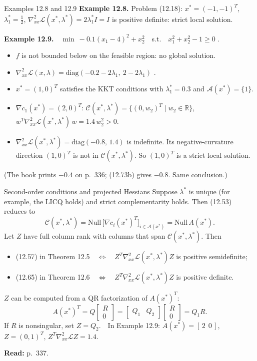 \documentclass[aspectratio=169,12pt]{beamer}
\newcommand{\R}{\mathbb{R}}
\newcommand{\xs}{x^{*}}
\newcommand{\eqn}[1]{\text{\small(#1)}}
\newcommand{\readbook}[1]{{\color{red}\textbf{Read:} #1}}
\newcommand{\ls}{\lambda^{*}}
\newcommand{\cA}{\mathcal{A}}
\newcommand{\cC}{\mathcal{C}}
\newcommand{\cL}{\mathcal{L}}
\newcommand{\hessL}{\nabla_{xx}^{2}\cL}
\begin{document}
\begin{frame}{Examples 12.8 and 12.9}
  \textbf{Example 12.8.} Problem (12.18): $\xs=(-1,-1)^{T}$, $\ls_{1}=\tfrac12$,
  $\hessL(\xs,\ls)=2\ls_{1}I=I$ is positive definite: strict local solution.

  \vspace{0.4em}
  \textbf{Example 12.9.}\ \ $\min\ -0.1(x_{1}-4)^{2}+x_{2}^{2}$\ \ s.t.\ \ $x_{1}^{2}+x_{2}^{2}-1\ge 0$ \eqn{12.72}.
  \begin{itemize}\setlength\itemsep{0.2em}
    \item $f$ is not bounded below on the feasible region: no global solution.
    \item $\hessL(x,\lambda)=\mathrm{diag}(-0.2-2\lambda_{1},\ 2-2\lambda_{1})$ \eqn{12.73b}.
    \item $\xs=(1,0)^{T}$ satisfies the KKT conditions with $\ls_{1}=0.3$ and $\cA(\xs)=\{1\}$.
    \item $\nabla c_{1}(\xs)=(2,0)^{T}$: $\cC(\xs,\ls)=\{(0,w_{2})^{T}\mid w_{2}\in\R\}$,
      $w^{T}\hessL(\xs,\ls)\,w=1.4\,w_{2}^{2}>0$.
    \item $\hessL(\xs,\ls)=\mathrm{diag}(-0.8,\,1.4)$ is indefinite. Its negative-curvature direction
      $(1,0)^{T}$ is not in $\cC(\xs,\ls)$. So $(1,0)^{T}$ is a strict local solution.
  \end{itemize}
  {\small (The book prints $-0.4$ on p.~336; (12.73b) gives $-0.8$. Same conclusion.)}
\end{frame}

\begin{frame}{Second-order conditions and projected Hessians}
  Suppose $\ls$ is unique (for example, the LICQ holds) and strict complementarity holds.
  Then (12.53) reduces to
  \[ \cC(\xs,\ls)=\mathrm{Null}\,\bigl[\nabla c_{i}(\xs)^{T}\bigr]_{i\in\cA(\xs)}=\mathrm{Null}\,A(\xs) . \]
  Let $Z$ have full column rank with columns that span $\cC(\xs,\ls)$. Then
  \begin{itemize}\setlength\itemsep{0.3em}
    \item (12.57) in Theorem 12.5\ \ $\Leftrightarrow$\ \ $Z^{T}\hessL(\xs,\ls)Z$ is positive semidefinite;
    \item (12.65) in Theorem 12.6\ \ $\Leftrightarrow$\ \ $Z^{T}\hessL(\xs,\ls)Z$ is positive definite.
  \end{itemize}
  $Z$ can be computed from a QR factorization of $A(\xs)^{T}$:
  \[ A(\xs)^{T}=Q\begin{bmatrix}R\\0\end{bmatrix}
     =\begin{bmatrix}Q_{1} & Q_{2}\end{bmatrix}\begin{bmatrix}R\\0\end{bmatrix}=Q_{1}R . \tag{12.74} \]
  If $R$ is nonsingular, set $Z=Q_{2}$.\ \ In Example 12.9: $A(\xs)=[\,2\ \ 0\,]$, $Z=(0,1)^{T}$,
  $Z^{T}\hessL Z=1.4$.

  \vspace{0.3em}
  \readbook{p.~337.}
\end{frame}
\end{document}
